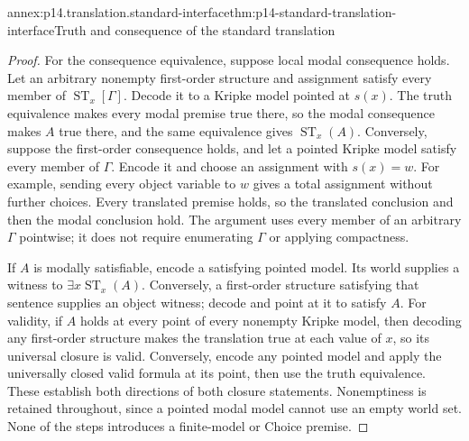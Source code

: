 \begin{annexitem}{annex:p14.translation.standard-interface}{thm:p14-standard-translation-interface}{Truth and consequence of the standard translation}
\begin{proof}
For the consequence equivalence, suppose local modal consequence holds.
Let an arbitrary nonempty first-order structure and assignment satisfy
every member of \(\operatorname{ST}_x[\Gamma]\). Decode it to a Kripke
model pointed at \(s(x)\). The truth equivalence makes every modal premise
true there, so the modal consequence makes \(A\) true there, and the
same equivalence gives \(\operatorname{ST}_x(A)\). Conversely, suppose
the first-order consequence holds, and let a pointed Kripke model satisfy
every member of \(\Gamma\). Encode it and choose an assignment with
\(s(x)=w\). For example, sending every object variable to \(w\)
gives a total assignment without further choices. Every translated premise
holds, so the translated conclusion and then the modal conclusion hold.
The argument uses every member of an arbitrary \(\Gamma\) pointwise;
it does not require enumerating \(\Gamma\) or applying compactness.

If \(A\) is modally satisfiable, encode a satisfying pointed model. Its
world supplies a witness to \(\exists x\operatorname{ST}_x(A)\).
Conversely, a first-order structure satisfying that sentence supplies an
object witness; decode and point at it to satisfy \(A\).
For validity, if \(A\) holds at every point of every nonempty Kripke
model, then decoding any first-order structure makes the translation
true at each value of \(x\), so its universal closure is valid.
Conversely, encode any pointed model and apply the universally closed
valid formula at its point, then use the truth equivalence.
These establish both directions of both closure statements. Nonemptiness
is retained throughout, since a pointed modal model cannot use an empty
world set. None of the steps introduces a finite-model or Choice premise.
\end{proof}
\end{annexitem}

